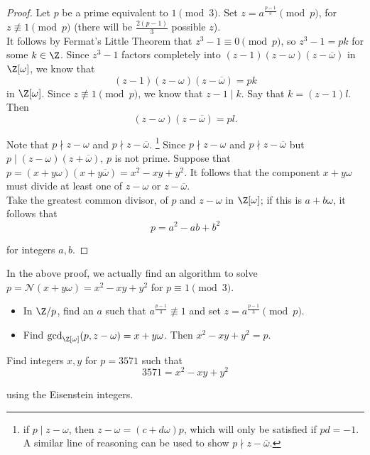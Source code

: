 \documentclass[11pt]{article}
\begin{document}
\begin{proof}
Let $p$ be a prime equivalent to $1 \pmod 3$. Set $z = a^{\frac{p-1}{3}} \pmod{p}$, for $z \not\equiv 1 \pmod{p}$ (there will be $\frac{2(p-1)}{3}$ possible $z$).\\

It follows by Fermat's Little Theorem that $z^3 - 1 \equiv 0 \pmod p$, so $z^3 - 1 = pk$ for some $k \in \Z$.
Since $z^3 - 1$ factors completely into $(z-1)(z-\omega)(z-\overline{\omega})$ in $\Z[\omega]$, we know that
\[
    (z-1)(z-\omega)(z-\overline{\omega}) = pk
\]
in $\Z[\omega]$. Since $z \not\equiv 1 \pmod{p}$, we know that $z - 1 \mid k$. Say that $k = (z-1)l$. Then 
\[
    (z-\omega)(z-\overline{\omega}) = pl.
\]

Note that $p \nmid z-\omega$ and $p \nmid z-\overline{\omega}$.
\footnote{if $p \mid z-\omega$, then $z-\omega = (c+d\omega)p$, which will only be satisfied if $pd = -1$. A similar line of reasoning
can be used to show $p \nmid z-\overline{\omega}$.} Since $p \nmid z-\omega$ and $p \nmid z-\overline{\omega}$ but $p \mid (z-\omega)(z+\overline{\omega})$, $p$ is not prime. 
Suppose that $p = (x+y\omega)(x+y\overline{\omega}) = x^2 - xy + y^2$. It follows that the component $x + y\omega$ must divide at least one of $z-\omega$ or $z-\overline{\omega}$. \\

Take the greatest common divisor, of $p$ and $z - \omega$ in $\Z[\omega]$; if this is $a + b\omega$, it follows that
\[
    p = a^2 - ab + b^2
\]

for integers $a, b$.
\end{proof}

In the above proof, we actually find an algorithm to solve $p = \mathcal{N}(x+y\omega) = x^2 - xy + y^2$ for $p \equiv 1 \pmod 3$.
\begin{itemize}
    \item In $\Z /p$, find an $a$ such that $a^{\frac{p-1}{3}} \not\equiv 1$ and set $z = a^{\frac{p-1}{3}} \pmod p$.
    \item Find $\mathrm{gcd}_{\Z[\omega]}(p, z-\omega) = x+y\omega$. Then $x^2 - xy + y^2 = p$. 
\end{itemize}


\begin{eg}
Find integers $x, y$ for $p = 3571$ such that
\[
    3571 = x^2 - xy + y^2
\]

using the Eisenstein integers.
\end{eg}
\end{document}
